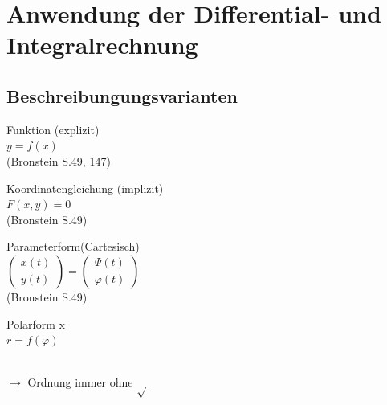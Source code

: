 \section{Anwendung der Differential- und Integralrechnung}

\subsection{Beschreibungungsvarianten}
	\begin{minipage}[t]{3.5cm}
		Funktion (explizit) \\
		$ y = f(x)$ \\
        \tiny{(Bronstein S.49, 147)}
	\end{minipage}
	\begin{minipage}[t]{6cm} 		
		Koordinatengleichung (implizit) \\
		$ F(x,y) = 0 $ \\
        \tiny{(Bronstein S.49)}
	\end{minipage}
	\begin{minipage}[t]{5.5cm} 		
		Parameterform(Cartesisch) \\
		$ \left( \begin{array} {l} x(t) \\ y(t) \end{array} \right) =
          \left( \begin{array} {l} \Psi(t) \\ \varphi(t) \end{array} \right)$\\
        \tiny{(Bronstein S.49)}
	\end{minipage} 
	\begin{minipage}[t]{3cm}
    	Polarform x\\
    	$ r=f(\varphi) $ \\
    \end{minipage}\\

	$\rightarrow$ Ordnung immer ohne $\sqrt{\text{ }}$ \\

